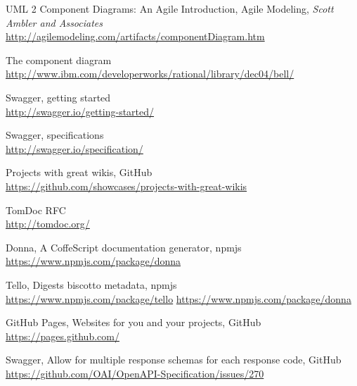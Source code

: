  UML 2 Component Diagrams: An Agile Introduction,
    \newblock Agile Modeling, \emph{Scott Ambler and Associates}\\
    \newblock \url{http://agilemodeling.com/artifacts/componentDiagram.htm}

 The component diagram\\
    \newblock \url{http://www.ibm.com/developerworks/rational/library/dec04/bell/}

 Swagger, getting started\\
    \newblock \url{http://swagger.io/getting-started/}

 Swagger, specifications\\
    \newblock \url{http://swagger.io/specification/}

 Projects with great wikis,
    \newblock GitHub\\
    \newblock \url{https://github.com/showcases/projects-with-great-wikis}

 TomDoc RFC\\
    \newblock \url{http://tomdoc.org/}

 Donna, A CoffeScript documentation generator,
    \newblock npmjs\\
    \newblock \url{https://www.npmjs.com/package/donna}

 Tello, Digests biscotto metadata,
    \newblock npmjs\\
    \newblock \url{https://www.npmjs.com/package/tello}
    \newblock \url{https://www.npmjs.com/package/donna}

 GitHub Pages, Websites for you and your projects,
    \newblock GitHub\\
    \newblock \url{https://pages.github.com/}

 Swagger, Allow for multiple response schemas for each response code,
    \newblock GitHub\\
    \newblock \url{https://github.com/OAI/OpenAPI-Specification/issues/270}